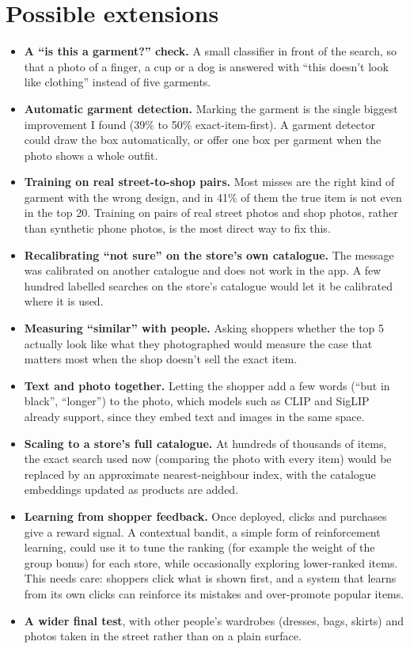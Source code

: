 \documentclass[11pt,a4paper]{article}
\begin{document}
\section{Possible extensions}

\begin{itemize}
\item \textbf{A ``is this a garment?'' check.} A small classifier in front of the search, so that a photo of a
  finger, a cup or a dog is answered with ``this doesn't look like clothing'' instead of five garments.
\item \textbf{Automatic garment detection.} Marking the garment is the single biggest improvement I found
  (39\% to 50\% exact-item-first). A garment detector could draw the box automatically, or offer one box per
  garment when the photo shows a whole outfit.
\item \textbf{Training on real street-to-shop pairs.} Most misses are the right kind of garment with the
  wrong design, and in 41\% of them the true item is not even in the top 20. Training on pairs of real street
  photos and shop photos, rather than synthetic phone photos, is the most direct way to fix this.
\item \textbf{Recalibrating ``not sure'' on the store's own catalogue.} The message was calibrated on another
  catalogue and does not work in the app. A few hundred labelled searches on the store's catalogue would let
  it be calibrated where it is used.
\item \textbf{Measuring ``similar'' with people.} Asking shoppers whether the top 5 actually look like what
  they photographed would measure the case that matters most when the shop doesn't sell the exact item.
\item \textbf{Text and photo together.} Letting the shopper add a few words (``but in black'', ``longer'') to
  the photo, which models such as CLIP and SigLIP already support, since they embed text and images in the
  same space.
\item \textbf{Scaling to a store's full catalogue.} At hundreds of thousands of items, the exact search used
  now (comparing the photo with every item) would be replaced by an approximate nearest-neighbour index,
  with the catalogue embeddings updated as products are added.
\item \textbf{Learning from shopper feedback.} Once deployed, clicks and purchases give a reward signal.
  A contextual bandit, a simple form of reinforcement learning, could use it to tune the ranking (for example
  the weight of the group bonus) for each store, while occasionally exploring lower-ranked items. This needs
  care: shoppers click what is shown first, and a system that learns from its own clicks can reinforce its
  mistakes and over-promote popular items.
\item \textbf{A wider final test}, with other people's wardrobes (dresses, bags, skirts) and photos taken in
  the street rather than on a plain surface.
\end{itemize}
\end{document}
